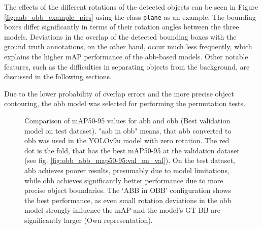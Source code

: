 The effects of the different rotations of the detected objects can be seen in Figure \ref{fig:aab_obb_example_pics} using the class \texttt{plane} as an example. The bounding boxes differ significantly in terms of their rotation angles between the three models. Deviations in the overlap of the detected bounding boxes with the ground truth annotations, on the other hand, occur much less frequently, which explains the higher \acrshort{mAP} performance of the \acrshort{abb}-based models. Other notable features, such as the difficulties in separating objects from the background, are discussed in the following sections.

Due to the lower probability of overlap errors and the more precise object contouring, the \acrshort{obb} model was selected for performing the permutation tests.







\begin{figure}[htbp]
    \centering
    
    \caption[Comparison of \acrshort{mAP}50-95 values for \acrshort{abb} and \acrshort{obb} (Best validation model on test dataset)]{Comparison of \acrshort{mAP}50-95 values for \acrshort{abb} and \acrshort{obb} (Best validation model on test dataset). "aab in obb" means, that \acrlong{abb} converted to obb was used in the \acrshort{YOLO}v9u model with zero rotation. The red dot is the fold, that has the best \acrshort{mAP}50-95 at the validation dataset (see fig. \ref{fig:obb_abb_map50-95:val_on_val}).  On the test dataset, \acrshort{abb} achieves poorer results, presumably due to model limitations, while \acrshort{obb} achieves significantly better performance due to more precise object boundaries. The ‘ABB in OBB’ configuration shows the best performance, as even small rotation deviations in the \acrshort{obb} model strongly influence the \acrshort{mAP} and the model's \acrshort{GT} \acrshort{BB} are significantly larger (Own representation). }
    \label{fig:obb_abb_map50-95:val_on_test}
\end{figure}


